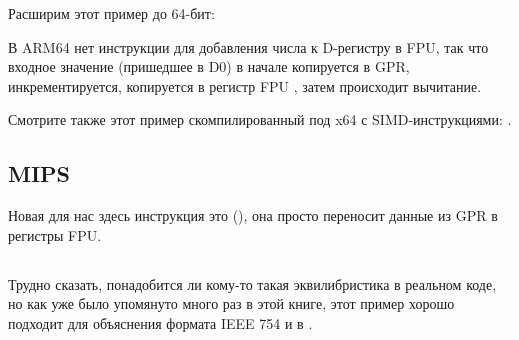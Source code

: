 Расширим этот пример до 64-бит:



В ARM64 нет инструкции для добавления числа к D-регистру в FPU, так что входное значение
(пришедшее в D0) в начале копируется в \ac{GPR},
инкрементируется, копируется в регистр FPU , затем происходит вычитание.



Смотрите также этот пример скомпилированный под x64 с SIMD-инструкциями: .

\subsection{MIPS}

Новая для нас здесь инструкция это  (), она просто переносит данные из \ac{GPR} в регистры FPU.



\subsection{\Conclusion}

Трудно сказать, понадобится ли кому-то такая эквилибристика в реальном коде,
но как уже было упомянуто много раз в этой книге, этот пример хорошо подходит для объяснения формата
IEEE 754 и  в \CCpp.

